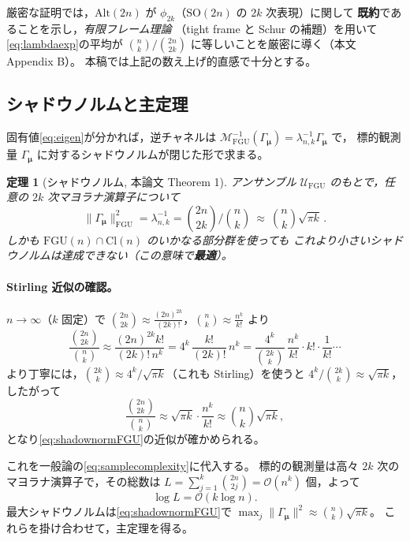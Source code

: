 \documentclass[11pt,a4paper]{ltjsarticle}
\newcommand{\Uc}{\mathcal{U}}
\newcommand{\Mc}{\mathcal{M}}
\newcommand{\FGU}{\mathrm{FGU}}
\newcommand{\SO}{\mathrm{SO}}
\newcommand{\Cl}{\mathrm{Cl}}
\newcommand{\Alt}{\mathrm{Alt}}
\theoremstyle{definition}
\theoremstyle{plain}
\newtheorem{teiri}{定理}[section]
\begin{document}
厳密な証明では，$\Alt(2n)$ が $\phi_{2k}$（$\SO(2n)$ の $2k$ 次表現）に関して
\textbf{既約}であることを示し，\emph{有限フレーム理論}
（tight frame と Schur の補題）を用いて\eqref{eq:lambdaexp}の平均が
$\binom nk/\binom{2n}{2k}$ に等しいことを厳密に導く（本文 Appendix B）。
本稿では上記の数え上げ的直感で十分とする。

\subsection{シャドウノルムと主定理}
固有値\eqref{eq:eigen}が分かれば，逆チャネルは
$\Mc_\FGU^{-1}(\Gamma_{\bm\mu})=\lambda_{n,k}^{-1}\Gamma_{\bm\mu}$ で，
標的観測量 $\Gamma_{\bm\mu}$ に対するシャドウノルムが閉じた形で求まる。

\begin{teiri}[シャドウノルム, 本論文 Theorem 1]\label{thm:shadownorm}
アンサンブル $\Uc_\FGU$ のもとで，任意の $2k$ 次マヨラナ演算子について
\begin{equation}
  \|\Gamma_{\bm\mu}\|^2_{\FGU}
  =\lambda_{n,k}^{-1}
  =\binom{2n}{2k}\Big/\binom{n}{k}
  \ \approx\ \binom{n}{k}\sqrt{\pi k}\, .
  \label{eq:shadownormFGU}
\end{equation}
しかも $\FGU(n)\cap\Cl(n)$ の\emph{いかなる部分群}を使っても
これより小さいシャドウノルムは達成できない（この意味で\textbf{最適}）。
\end{teiri}

\paragraph{Stirling 近似の確認。}
$n\to\infty$（$k$ 固定）で
$\binom{2n}{2k}\approx\frac{(2n)^{2k}}{(2k)!}$，$\binom nk\approx\frac{n^k}{k!}$ より
\[
  \frac{\binom{2n}{2k}}{\binom nk}
  \approx\frac{(2n)^{2k}k!}{(2k)!\,n^k}
  =4^k\,\frac{k!}{(2k)!}\,n^k
  =\frac{4^k}{\binom{2k}{k}}\,\frac{n^k}{k!}\cdot k!\cdot\frac1{k!}\cdots
\]
より丁寧には，$\binom{2k}{k}\approx 4^k/\sqrt{\pi k}$（これも Stirling）を使うと
$4^k/\binom{2k}{k}\approx\sqrt{\pi k}$，したがって
\[
  \frac{\binom{2n}{2k}}{\binom nk}
  \approx \sqrt{\pi k}\cdot\frac{n^k}{k!}
  \approx \binom nk\sqrt{\pi k},
\]
となり\eqref{eq:shadownormFGU}の近似が確かめられる。

\medskip
これを一般論の\eqref{eq:samplecomplexity}に代入する。
標的の観測量は高々 $2k$ 次のマヨラナ演算子で，その総数は
$L=\sum_{j=1}^{k}\binom{2n}{2j}=\mathcal O(n^k)$ 個，よって
\[
  \log L=\mathcal O(k\log n).
\]
最大シャドウノルムは\eqref{eq:shadownormFGU}で
$\max_j\|\Gamma_{\bm\mu}\|^2\approx\binom nk\sqrt{\pi k}$。
これらを掛け合わせて，主定理を得る。
\end{document}
